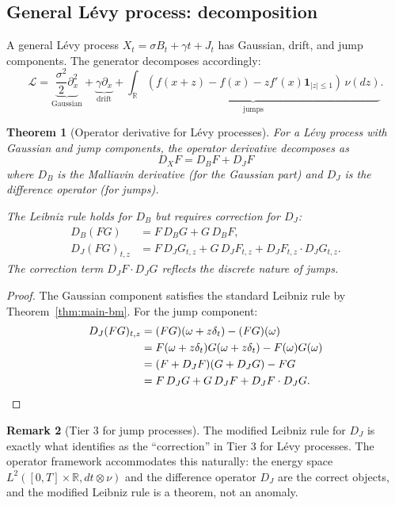 \documentclass[11pt]{article}
\newtheorem{theorem}{Theorem}[section]
\theoremstyle{definition}
\newtheorem{remark}[theorem]{Remark}
\newcommand{\R}{\mathbb{R}}
\begin{document}
\subsection{General L\'evy process: decomposition}

A general L\'evy process $X_t = \sigma B_t + \gamma t + J_t$ has Gaussian, drift, and jump components. The generator decomposes accordingly:
\begin{equation}
\mathcal{L} = \underbrace{\frac{\sigma^2}{2}\partial_x^2}_{\text{Gaussian}} + \underbrace{\gamma \partial_x}_{\text{drift}} + \underbrace{\int_{\R}(f(x+z) - f(x) - zf'(x)\mathbf{1}_{|z|\leq 1})\,\nu(dz)}_{\text{jumps}}.
\end{equation}

\begin{theorem}[Operator derivative for L\'evy processes]\label{thm:levy-operator}
For a L\'evy process with Gaussian and jump components, the operator derivative decomposes as
\begin{equation}
D_X F = D_B F + D_J F
\end{equation}
where $D_B$ is the Malliavin derivative (for the Gaussian part) and $D_J$ is the difference operator (for jumps).

The Leibniz rule holds for $D_B$ but requires correction for $D_J$:
\begin{align}
D_B(FG) &= F \, D_B G + G \, D_B F, \\
D_J(FG)_{t,z} &= F \, D_J G_{t,z} + G \, D_J F_{t,z} + D_J F_{t,z} \cdot D_J G_{t,z}.
\end{align}
The correction term $D_J F \cdot D_J G$ reflects the discrete nature of jumps.
\end{theorem}

\begin{proof}
The Gaussian component satisfies the standard Leibniz rule by Theorem~\ref{thm:main-bm}. For the jump component:
\begin{align}
D_J(FG)_{t,z} &= (FG)(\omega + z\delta_t) - (FG)(\omega) \\
&= F(\omega + z\delta_t) G(\omega + z\delta_t) - F(\omega)G(\omega) \\
&= (F + D_J F)(G + D_J G) - FG \\
&= F \, D_J G + G \, D_J F + D_J F \cdot D_J G. \qedhere
\end{align}
\end{proof}

\begin{remark}[Tier 3 for jump processes]
The modified Leibniz rule for $D_J$ is exactly what \cite{PaperIV} identifies as the ``correction'' in Tier 3 for L\'evy processes. The operator framework accommodates this naturally: the energy space $L^2([0,T] \times \R, dt \otimes \nu)$ and the difference operator $D_J$ are the correct objects, and the modified Leibniz rule is a theorem, not an anomaly.
\end{remark}
\end{document}
